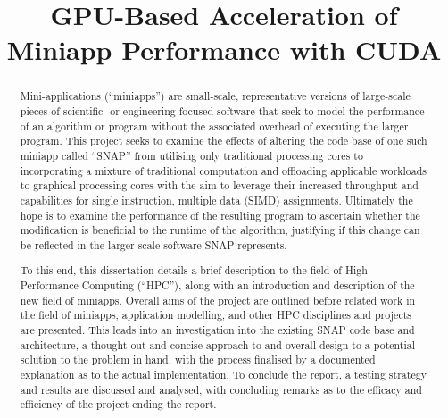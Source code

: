\documentclass[conference]{IEEEtran}
\begin{document}
\title{GPU-Based Acceleration of Miniapp Performance with CUDA}


\author{
}


\maketitle


\begin{abstract}

Mini-applications (``miniapps'') are small-scale, representative versions of large-scale pieces of scientific- or engineering-focused software that seek to model the performance of an algorithm or program without the associated overhead of executing the larger program. This project seeks to examine the effects of altering the code base of one such miniapp called ``SNAP'' from utilising only traditional processing cores to incorporating a mixture of traditional computation and offloading applicable workloads to graphical processing cores with the aim to leverage their increased throughput and capabilities for single instruction, multiple data (SIMD) assignments. Ultimately the hope is to examine the performance of the resulting program to ascertain whether the modification is beneficial to the runtime of the algorithm, justifying if this change can be reflected in the larger-scale software SNAP represents.

To this end, this dissertation details a brief description to the field of High-Performance Computing (``HPC''), along with an introduction and description of the new field of miniapps. Overall aims of the project are outlined before related work in the field of miniapps, application modelling, and other HPC disciplines and projects are presented. This leads into an investigation into the existing SNAP code base and architecture, a thought out and concise approach to and overall design to a potential solution to the problem in hand, with the process finalised by a documented explanation as to the actual implementation. To conclude the report, a testing strategy and results are discussed and analysed, with concluding remarks as to the efficacy and efficiency of the project ending the report.

\end{abstract}

\end{document}
